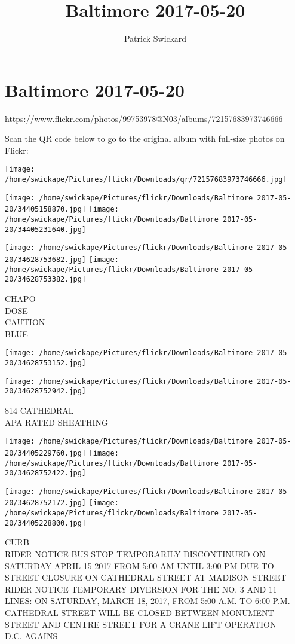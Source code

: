 \documentclass[10pt,letterpaper]{article}
\title{Baltimore 2017-05-20}
\author{Patrick Swickard}
\date{}
\begin{document}
\section*{Baltimore 2017-05-20}

\url{https://www.flickr.com/photos/99753978@N03/albums/72157683973746666}

Scan the QR code below to go to the original album with full-size photos on Flickr:

\texttt{[image: /home/swickape/Pictures/flickr/Downloads/qr/72157683973746666.jpg]}
\pagebreak

\texttt{[image: /home/swickape/Pictures/flickr/Downloads/Baltimore 2017-05-20/34405158870.jpg]}
\texttt{[image: /home/swickape/Pictures/flickr/Downloads/Baltimore 2017-05-20/34405231640.jpg]}

\texttt{[image: /home/swickape/Pictures/flickr/Downloads/Baltimore 2017-05-20/34628753682.jpg]}
\texttt{[image: /home/swickape/Pictures/flickr/Downloads/Baltimore 2017-05-20/34628753382.jpg]}

CHAPO\\
DOSE\\
CAUTION\\
BLUE
\pagebreak

\texttt{[image: /home/swickape/Pictures/flickr/Downloads/Baltimore 2017-05-20/34628753152.jpg]}

\vspace{0.25in}
\texttt{[image: /home/swickape/Pictures/flickr/Downloads/Baltimore 2017-05-20/34628752942.jpg]}

814 CATHEDRAL\\
APA RATED SHEATHING
\pagebreak

\texttt{[image: /home/swickape/Pictures/flickr/Downloads/Baltimore 2017-05-20/34405229760.jpg]}
\texttt{[image: /home/swickape/Pictures/flickr/Downloads/Baltimore 2017-05-20/34628752422.jpg]}

\texttt{[image: /home/swickape/Pictures/flickr/Downloads/Baltimore 2017-05-20/34628752172.jpg]}
\texttt{[image: /home/swickape/Pictures/flickr/Downloads/Baltimore 2017-05-20/34405228800.jpg]}

CURB\\
RIDER NOTICE BUS STOP TEMPORARILY DISCONTINUED ON SATURDAY APRIL 15 2017 FROM 5:00 AM UNTIL 3:00 PM DUE TO STREET CLOSURE ON CATHEDRAL STREET AT MADISON STREET\\
RIDER NOTICE TEMPORARY DIVERSION FOR THE NO. 3 AND 11 LINES: ON SATURDAY, MARCH 18, 2017, FROM 5:00 A.M. TO 6:00 P.M. CATHEDRAL STREET WILL BE CLOSED BETWEEN MONUMENT STREET AND CENTRE STREET FOR A CRANE LIFT OPERATION\\
D.C. AGAINS
\pagebreak
\end{document}
